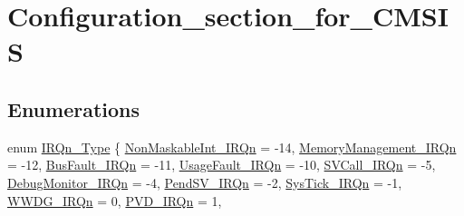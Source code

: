 \hypertarget{group___configuration__section__for___c_m_s_i_s}{}\section{Configuration\+\_\+section\+\_\+for\+\_\+\+C\+M\+S\+IS}
\label{group___configuration__section__for___c_m_s_i_s}
\subsection*{Enumerations}
\begin{DoxyCompactItemize}
\item 
enum \mbox{\hyperlink{group___configuration__section__for___c_m_s_i_s_ga7e1129cd8a196f4284d41db3e82ad5c8}{I\+R\+Qn\+\_\+\+Type}} \{ \newline
\mbox{\hyperlink{group___configuration__section__for___c_m_s_i_s_gga7e1129cd8a196f4284d41db3e82ad5c8ade177d9c70c89e084093024b932a4e30}{Non\+Maskable\+Int\+\_\+\+I\+R\+Qn}} = -\/14, 
\mbox{\hyperlink{group___configuration__section__for___c_m_s_i_s_gga7e1129cd8a196f4284d41db3e82ad5c8a33ff1cf7098de65d61b6354fee6cd5aa}{Memory\+Management\+\_\+\+I\+R\+Qn}} = -\/12, 
\mbox{\hyperlink{group___configuration__section__for___c_m_s_i_s_gga7e1129cd8a196f4284d41db3e82ad5c8a8693500eff174f16119e96234fee73af}{Bus\+Fault\+\_\+\+I\+R\+Qn}} = -\/11, 
\mbox{\hyperlink{group___configuration__section__for___c_m_s_i_s_gga7e1129cd8a196f4284d41db3e82ad5c8a6895237c9443601ac832efa635dd8bbf}{Usage\+Fault\+\_\+\+I\+R\+Qn}} = -\/10, 
\newline
\mbox{\hyperlink{group___configuration__section__for___c_m_s_i_s_gga7e1129cd8a196f4284d41db3e82ad5c8a4ce820b3cc6cf3a796b41aadc0cf1237}{S\+V\+Call\+\_\+\+I\+R\+Qn}} = -\/5, 
\mbox{\hyperlink{group___configuration__section__for___c_m_s_i_s_gga7e1129cd8a196f4284d41db3e82ad5c8a8e033fcef7aed98a31c60a7de206722c}{Debug\+Monitor\+\_\+\+I\+R\+Qn}} = -\/4, 
\mbox{\hyperlink{group___configuration__section__for___c_m_s_i_s_gga7e1129cd8a196f4284d41db3e82ad5c8a03c3cc89984928816d81793fc7bce4a2}{Pend\+S\+V\+\_\+\+I\+R\+Qn}} = -\/2, 
\mbox{\hyperlink{group___configuration__section__for___c_m_s_i_s_gga7e1129cd8a196f4284d41db3e82ad5c8a6dbff8f8543325f3474cbae2446776e7}{Sys\+Tick\+\_\+\+I\+R\+Qn}} = -\/1, 
\newline
\mbox{\hyperlink{group___configuration__section__for___c_m_s_i_s_gga7e1129cd8a196f4284d41db3e82ad5c8a971089d7566ef902dfa0c80ac3a8fd52}{W\+W\+D\+G\+\_\+\+I\+R\+Qn}} = 0, 
\mbox{\hyperlink{group___configuration__section__for___c_m_s_i_s_gga7e1129cd8a196f4284d41db3e82ad5c8ab0b51ffcc4dcf5661141b79c8e5bd924}{P\+V\+D\+\_\+\+I\+R\+Qn}} = 1, 

\end{DoxyCompactItemize}
